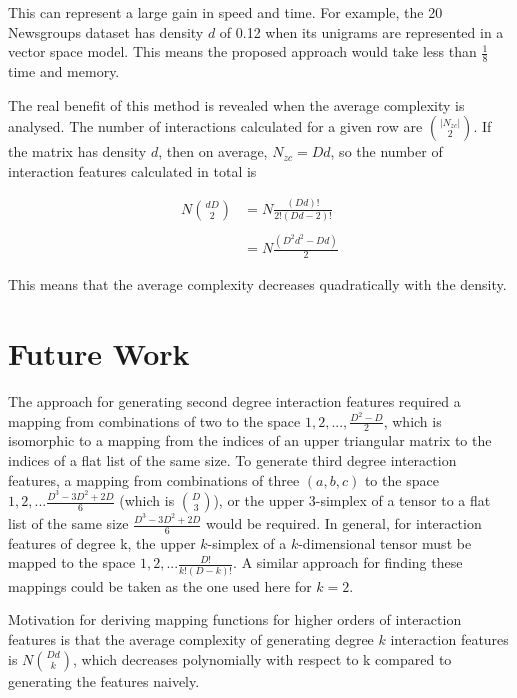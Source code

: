 \documentclass[11pt]{article}
\begin{document}
This can represent a large gain in speed and time. For example, the 20 Newsgroups dataset 
has density $d$ of 0.12 when its unigrams are represented in a vector space model. This 
means the proposed approach would take less than $\frac{1}{8}$ time and memory.

The real benefit of this method is revealed when the average complexity is analysed. The 
number of interactions calculated for a given row are $\binom{|N_{zc}|}{2}$. If the matrix has 
density $d$, then on average, $N_{zc} = D d$, so the number of interaction features 
calculated in total is 

\begin{align*}
N \binom{d D}{2} &= N \frac{(Dd)!}{2!(Dd-2)!}\\
    \\
    &= N \frac{(D^2d^2-Dd)}{2}
\end{align*}

This means that the average complexity decreases quadratically with the density.

\section{Future Work}
The approach for generating second degree interaction features required a mapping from 
combinations of two to the space $1,2,...,\frac{D^2-D}{2}$, which is isomorphic to a mapping from 
the indices of an upper triangular matrix to the indices of a flat list of the same size. 
To generate third degree interaction features, a mapping from combinations of three 
$(a,b,c)$ to the space $1,2,...\frac{D^3-3D^2+2D}{6}$ (which is $\binom{D}{3}$), or the upper $3$-simplex of a tensor to a flat 
list of the same size $\frac{D^3-3D^2+2D}{6}$ would be required. In general, for interaction 
features of degree k, the upper $k$-simplex of a $k$-dimensional tensor must be mapped to the 
space $1,2,...\frac{D!}{k!(D-k)!}$. A similar approach for finding these mappings could be taken 
as the one used here for $k=2$. 

Motivation for deriving mapping functions for higher orders
of interaction features is that the average complexity of generating degree $k$ interaction
features is $N \binom{Dd}{k}$, which decreases polynomially with respect to k compared to
generating the features naively.

    
\vskip 0.2in

\end{document}
